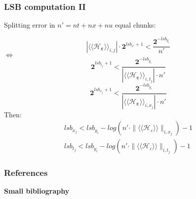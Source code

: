 \addtocounter{framenumber}{-1}
\begin{frame}
	\frametitle{LSB computation II}
		Splitting error in $n'=nt+nx+nu$ equal chunks:

		\begin{equation} \label{constraint}
			| \langle\langle \mathcal{H}_{\boldsymbol{\varepsilon}} \rangle\rangle_{i,j} | \cdot \boldsymbol{2}^{lsb_{v'}+1} < \frac{\boldsymbol{2}^{-lsb_{y_i}}}{n'}
		\end{equation}
		$\Leftrightarrow$
		\begin{equation} \label{constraint}
			\boldsymbol{2}^{lsb_{t_j}+1} < \frac{\boldsymbol{2}^{-lsb_{y_i}}}{| \langle\langle \mathcal{H}_{\boldsymbol{\varepsilon}} \rangle\rangle_{i,t_j} | \cdot n'}
		\end{equation}
		\begin{equation} \label{constraint}
			\boldsymbol{2}^{lsb_{x_j}+1} < \frac{\boldsymbol{2}^{-lsb_{y_i}}}{| \langle\langle \mathcal{H}_{\boldsymbol{\varepsilon}} \rangle\rangle_{i,x_j} | \cdot n'}
		\end{equation}
		Then:
		\begin{eqnarray}
			lsb_{x_j} < lsb_{y_i}-log(n' \cdot \| \langle\langle \mathcal{H}_\varepsilon \rangle\rangle \|_{i,x_j})-1 \\
			lsb_{t_j} < lsb_{y_i}-log(n' \cdot \| \langle\langle \mathcal{H}_\varepsilon \rangle\rangle \|_{i,t_j})-1
		\end{eqnarray}




		
	
\addtocounter{framenumber}{-3}
\end{frame}

	\begin{frame}[allowframebreaks]
	\frametitle{References}
		\begin{center}
			\bfseries
			Small bibliography
		\end{center}
		\tiny
		
		\nocite{ChevillardJoldesLauter2010}
		\nocite{Volk15a}
		\nocite{DinechinPasca2011-DaT}
		\nocite{Chapman93:edn}
		\nocite{sifd}
		\nocite{sif}
		\nocite{sums}
		\nocite{hilaire}
		\nocite{lopez}
		\nocite{loopshaping}
		\nocite{stability}
		\nocite{constructing}
		  

	\end{frame}


